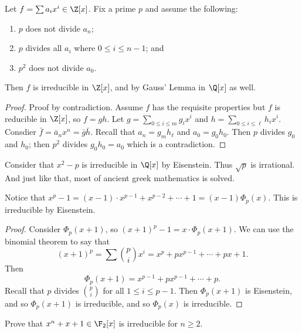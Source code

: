 \begin{lemma}
Let $f = \sum a_ix^i \in \Z[x]$. Fix a prime $p$ and assume the following:
\begin{enumerate}
\item $p$ does not divide $a_n$;
\item $p$ divides all $a_i$ where $0 \leq i \leq n-1$; and 
\item $p^2$ does not divide $a_0$.
\end{enumerate}
Then $f$ is irreducible in $\Z[x]$, and by Gauss' Lemma in $\Q[x]$ as well.
\end{lemma}

\begin{proof}
Proof by contradiction. Assume $f$ has the requisite properties but $f$ is reducible in $\Z[x]$, so $f = gh$. Let $g = \sum_{0 \leq i \leq m} g_ix^i$ and $h = \sum_{0 \leq i \leq \ell} h_ix^i$. Consdier $\bar{f} = \bar{a}_nx^n = \bar{g}\bar{h}$. Recall that $a_n = g_mh_\ell$ and $a_0 = g_0h_0$. Then $p$ divides $g_0$ and $h_0$; then $p^2$ divides $g_0h_0 = a_0$ which is a contradiction.
\end{proof}

\begin{example}
Consider that $x^2-p$ is irreducible in $\Q[x]$ by Eisenstein. Thus $\sqrt{p}$ is irrational. And just like that, most of ancient greek mathematics is solved.
\end{example}

\begin{example}
Notice that $x^p - 1 = (x-1) \cdot x^{p-1} + x^{p-2} + \cdots + 1 = (x-1)\Phi_p(x)$. This is irreducible by Eisenstein.

\begin{proof}
Consider $\Phi_p(x+1)$, so $(x+1)^p - 1 = x \cdot \Phi_p(x+1)$. We can use the binomial theorem to say that 
\[ (x+1)^p = \sum {p \choose i}x^i = x^p + px^{p-1} + \cdots + px + 1. \]
Then 
\[ \Phi_p(x+1) = x^{p-1} + px^{p-1} + \cdots + p. \]
Recall that $p$ divides ${p \choose i}$ for all $1 \leq i \leq p-1$. Then $\Phi_p(x+1)$ is Eisenstein, and so $\Phi_p(x+1)$ is irreducible, and so $\Phi_p(x)$ is irreducible.
\end{proof}
\end{example}

\begin{problem}
Prove that $x^n + x + 1 \in \F_2[x]$ is irreducible for $n \geq 2$.
\end{problem}